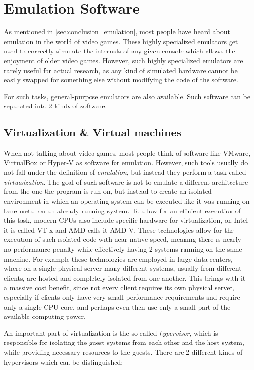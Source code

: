 \section{Emulation Software}\label{sec:emulators}
As mentioned in \autoref{sec:conclusion_emulation}, most people have heard about emulation in the world of video games.
These highly specialized emulators get used to correctly simulate the internals of any given console
which allows the enjoyment of older video games.
However, such highly specialized emulators are rarely useful for actual research,
as any kind of simulated hardware cannot be easily swapped for something else without modifying the code of the software.

For such tasks, general-purpose emulators are also available.
Such software can be separated into 2 kinds of software:

\subsection{Virtualization \& Virtual machines}
When not talking about video games, most people think of software like VMware, VirtualBox or Hyper-V
as software for emulation.
However, such tools usually do not fall under the definition of \emph{emulation},
but instead they perform a task called \emph{virtualization}.
The goal of such software is not to emulate a different architecture from the one the program is run on,
but instead to create an isolated environment in which an operating system can be executed
like it was running on bare metal on an already running system.
To allow for an efficient execution of this task, modern CPUs also include specific hardware for virtualization,
on Intel it is called VT-x and AMD calls it AMD-V.
These technologies allow for the execution of such isolated code with near-native speed,
meaning there is nearly no performance penalty while effectively having 2 systems running on the same machine.
For example these technologies are employed in large data centers,
where on a single physical server many different systems, usually from different clients,
are hosted and completely isolated from one another.
This brings with it a massive cost benefit, since not every client requires its own physical server,
especially if clients only have very small performance requirements and require only a single CPU core,
and perhaps even then use only a small part of the available computing power.

An important part of virtualization is the so-called \emph{hypervisor},
which is responsible for isolating the guest systems from each other and the host system,
while providing necessary resources to the guests\cite{hypervisor}.
There are 2 different kinds of hypervisors which can be distinguished:

